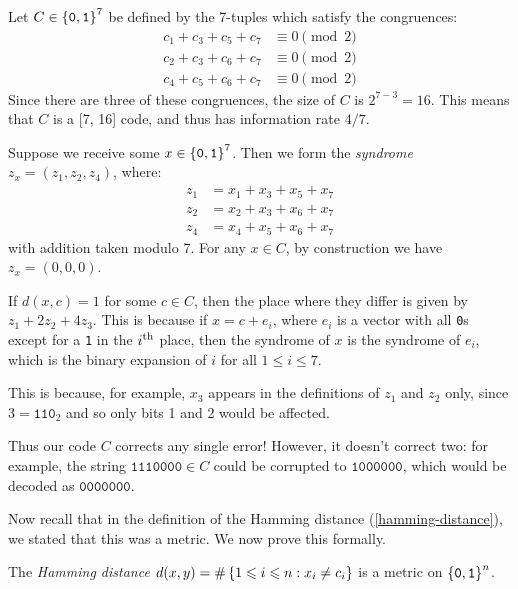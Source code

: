 \documentclass{article}
\begin{document}
\begin{example}
	\label{hammings-original-code}
    Let $C \in \left\lbrace \texttt{0}, \texttt{1} \right\rbrace^7$ be defined by the 7-tuples
    which satisfy the congruences:
    \begin{align*}
    	c_1 + c_3 + c_5 + c_7 &\equiv 0 \pmod 2 \\
    	c_2 + c_3 + c_6 + c_7 &\equiv 0 \pmod 2 \\
    	c_4 + c_5 + c_6 + c_7 &\equiv 0 \pmod 2
	\end{align*}
	Since there are three of these congruences,
	the size of $C$ is $2^{7-3} = 16$.
	This means that $C$ is a [7, 16] code,
	and thus has information rate $4/7$.
	
	Suppose we receive some $x \in \left\lbrace \texttt{0}, \texttt{1} \right\rbrace^7$.
	Then we form the \textit{syndrome} $z_x = (z_1, z_2, z_4)$, where:
	\begin{align*}
    	z_1 &= x_1 + x_3 + x_5 + x_7 \\
    	z_2 &= x_2 + x_3 + x_6 + x_7 \\
    	z_4 &= x_4 + x_5 + x_6 + x_7
	\end{align*}
	with addition taken modulo 7.
	For any $x \in C$, by construction we have $z_x = (0, 0, 0)$.
	
	If $d(x, c) = 1$ for some $c \in C$,
	then the place where they differ is given by $z_1 + 2z_2 + 4z_3$.
	This is because if $x = c + e_i$,
	where $e_i$ is a vector with all \texttt{0}s
	except for a \texttt{1} in the $i^{\text{th}}$ place,
	then the syndrome of $x$ is the syndrome of $e_i$,
	which is the binary expansion of $i$ for all $1 \leq i \leq 7$.
	
	This is because, for example,
	$x_3$ appears in the definitions of $z_1$ and $z_2$ only,
	since $3 = \texttt{110}_2$
	and so only bits 1 and 2 would be affected.
	
	Thus our code $C$ corrects any single error!
	However, it doesn't correct two:
	for example, the string $\texttt{1110000} \in C$
	could be corrupted to $\texttt{1000000}$,
	which would be decoded as $\texttt{0000000}$.
\end{example}

Now recall that in the definition of the Hamming distance (\ref{hamming-distance}),
we stated that this was a metric. We now prove this formally.

\begin{proposition}
    The \textit{Hamming distance}
    $d(x, y) = \#\left\lbrace 1 \leqslant i \leqslant n : x_i \neq c_i \right\rbrace$
    is a metric on $\left\lbrace \texttt{0}, \texttt{1} \right\rbrace^n$.
\end{proposition}
\end{document}

